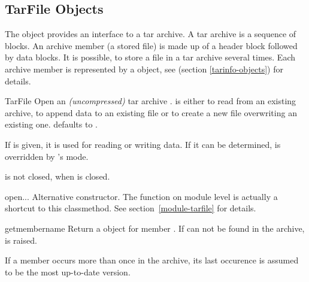 \begin{seealso}

\end{seealso}


\subsection{TarFile Objects \label{tarfile-objects}}

The  object provides an interface to a tar archive. A tar
archive is a sequence of blocks. An archive member (a stored file) is made up
of a header block followed by data blocks. It is possible, to store a file in a
tar archive several times. Each archive member is represented by a
 object, see  (section
\ref{tarinfo-objects}) for details.

\begin{classdesc}{TarFile}{}
    Open an \emph{(uncompressed)} tar archive .
     is either  to read from an existing archive,
     to append data to an existing file or  to create a new
    file overwriting an existing one.  defaults to .

    If  is given, it is used for reading or writing data.
    If it can be determined,  is overridden by 's mode.
    \begin{notice}
         is not closed, when  is closed.
    \end{notice}
\end{classdesc}

\begin{methoddesc}{open}{...}
    Alternative constructor. The  function on module level is
    actually a shortcut to this classmethod. See section~\ref{module-tarfile}
    for details.
\end{methoddesc}

\begin{methoddesc}{getmember}{name}
    Return a  object for member . If  can
    not be found in the archive,  is raised.
    \begin{notice}
        If a member occurs more than once in the archive, its last
        occurence is assumed to be the most up-to-date version.
    \end{notice}
\end{methoddesc}

